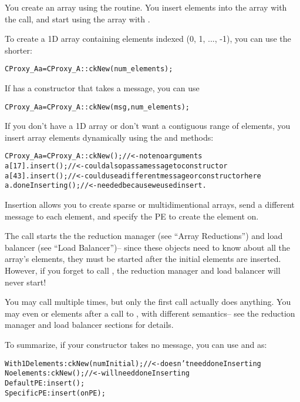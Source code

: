 You create an array using the 
routine.  You insert elements into the array with the
 call, and start using
the array with .

To create a 1D array containing elements indexed 
(0, 1, ..., -1), you can use the shorter:

\begin{alltt}
CProxy_A a = CProxy_A::ckNew(num_elements);
\end{alltt}

If  has a constructor that takes a message, you can use

\begin{alltt}
CProxy_A a = CProxy_A::ckNew(msg,num_elements);
\end{alltt}

If you don't have a 1D array or don't want a contiguous range
of elements, you insert array elements dynamically using the 
 and  methods:

\begin{alltt}
CProxy_A a = CProxy_A::ckNew(); //<- note no arguments
a[17].insert(); //<- could also pass a message to constructor
a[43].insert(); //<- could use a different message or constructor here
a.doneInserting(); //<- needed because we used insert.
\end{alltt}

Insertion allows you to create sparse or multidimentional arrays,
send a different message to each element, and specify the PE to create 
the element on.  

The  call starts the the reduction manager (see ``Array
Reductions'') and load balancer (see ``Load Balancer'')-- since
these objects need to know about all the array's elements, they
must be started after the initial elements are inserted.
However, if you forget to call , the reduction manager 
and load balancer will never start!

You may call  multiple times, but only the first
call actually does anything.  You may even  or 
elements after a call to , with different semantics-- 
see the reduction manager and load balancer sections for details.

To summarize, if your constructor takes no message, you can use  
and  as:

\begin{alltt}
With 1D elements: ckNew(numInitial); //<- doesn't need doneInserting
No elements:      ckNew(); //<- will need doneInserting
Default PE:       insert();
Specific PE:      insert(onPE);
\end{alltt}

